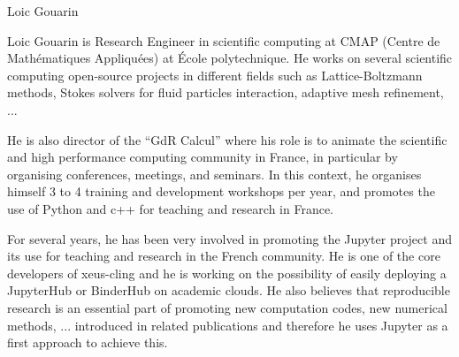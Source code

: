 \begin{participant}[type=leadPI,PM=8,gender=male]{Loic Gouarin}

  Loic Gouarin is Research Engineer in scientific computing at CMAP (Centre de
  Mathématiques Appliquées) at \'Ecole polytechnique. He works on several
  scientific computing open-source projects in different fields such as
  Lattice-Boltzmann methods, Stokes solvers for fluid particles interaction,
  adaptive mesh refinement, ...

  He is also director of the ``GdR Calcul'' where his role is to animate the
  scientific and high performance computing community in France, in particular
  by organising conferences, meetings, and seminars. In this context, he
  organises himself 3 to 4 training and development workshops per year, and
  promotes the use of Python and c++ for teaching and research in France.
  
  For several years, he has been very involved in promoting the Jupyter project
  and its use for teaching and research in the French community. He is one of
  the core developers of xeus-cling and he is working on the possibility of
  easily deploying a JupyterHub or BinderHub on academic clouds. He also
  believes that reproducible research is an essential part of promoting new
  computation codes, new numerical methods, ... introduced in related
  publications and therefore he uses Jupyter as a first approach to achieve this.
  
  \end{participant}
  
  
